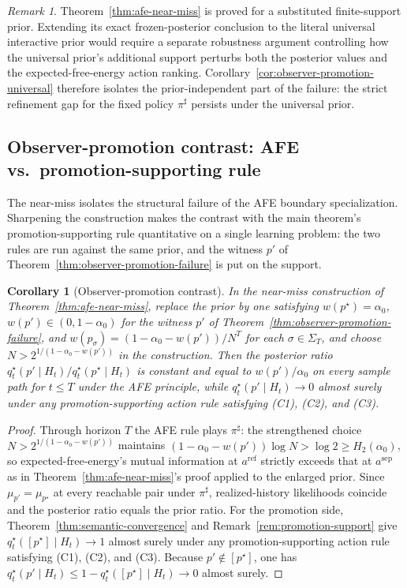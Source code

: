 \documentclass[11pt]{article}
\newtheorem{corollary}[theorem]{Corollary}
\theoremstyle{definition}
\theoremstyle{remark}
\newtheorem{remark}[theorem]{Remark}
\begin{document}
\begin{remark}
\label{rem:near-miss-universal}
Theorem~\ref{thm:afe-near-miss} is proved for a substituted finite-support prior. Extending its exact frozen-posterior conclusion to the literal universal interactive prior would require a separate robustness argument controlling how the universal prior's additional support perturbs both the posterior values and the expected-free-energy action ranking. Corollary~\ref{cor:observer-promotion-universal} therefore isolates the prior-independent part of the failure: the strict refinement gap for the fixed policy $\pi^\sharp$ persists under the universal prior.
\end{remark}

\subsection{Observer-promotion contrast: AFE vs.\ promotion-supporting rule}
\label{sec:promotion-contrast}

The near-miss isolates the structural failure of the AFE boundary specialization. Sharpening the construction makes the contrast with the main theorem's promotion-supporting rule quantitative on a single learning problem: the two rules are run against the same prior, and the witness $p'$ of Theorem~\ref{thm:observer-promotion-failure} is put on the support.

\begin{corollary}[Observer-promotion contrast]
\label{cor:promotion-contrast}
In the near-miss construction of Theorem~\ref{thm:afe-near-miss}, replace the prior by one satisfying $w(p^\star)=\alpha_0$, $w(p')\in(0,1-\alpha_0)$ for the witness $p'$ of Theorem~\ref{thm:observer-promotion-failure}, and $w(p_\sigma)=(1-\alpha_0-w(p'))/N^T$ for each $\sigma\in\Sigma_T$, and choose $N>2^{1/(1-\alpha_0-w(p'))}$ in the construction. Then the posterior ratio $q_t^\star(p'\mid H_t)/q_t^\star(p^\star\mid H_t)$ is constant and equal to $w(p')/\alpha_0$ on every sample path for $t\le T$ under the AFE principle, while $q_t^\star(p'\mid H_t)\to 0$ almost surely under any promotion-supporting action rule satisfying (C1), (C2), and (C3).
\end{corollary}

\begin{proof}
Through horizon $T$ the AFE rule plays $\pi^\sharp$: the strengthened choice $N>2^{1/(1-\alpha_0-w(p'))}$ maintains $(1-\alpha_0-w(p'))\log N>\log 2\ge H_2(\alpha_0)$, so expected-free-energy's mutual information at $a^{\mathrm{ref}}$ strictly exceeds that at $a^{\mathrm{sep}}$ as in Theorem~\ref{thm:afe-near-miss}'s proof applied to the enlarged prior. Since $\mu_{p'}=\mu_{p^\star}$ at every reachable pair under $\pi^\sharp$, realized-history likelihoods coincide and the posterior ratio equals the prior ratio. For the promotion side, Theorem~\ref{thm:semantic-convergence} and Remark~\ref{rem:promotion-support} give $q_t^\star([p^\star]\mid H_t)\to 1$ almost surely under any promotion-supporting action rule satisfying (C1), (C2), and (C3). Because $p'\notin[p^\star]$, one has $q_t^\star(p'\mid H_t)\le 1-q_t^\star([p^\star]\mid H_t)\to 0$ almost surely.
\end{proof}
\end{document}
